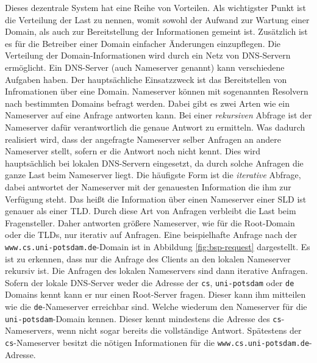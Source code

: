 \documentclass[a4paper, 12pt, BCOR10mm, DIV12, toc=bibliography, toc=listof, german]{scrbook}
\begin{document}
				Dieses dezentrale System hat eine Reihe von Vorteilen. Als wichtigster Punkt ist die
				Verteilung der Last zu nennen, womit sowohl der Aufwand zur Wartung einer Domain, als auch
				zur Bereitstellung der Informationen gemeint ist. Zusätzlich ist es für die Betreiber einer
				Domain einfacher Änderungen einzupflegen. Die Verteilung der Domain-Informationen wird durch
				ein Netz von DNS-Servern ermöglicht. Ein DNS-Server (auch Nameserver genannt) kann
				verschiedene Aufgaben haben. Der hauptsächliche Einsatzzweck ist das Bereitstellen von
				Infromationen über eine Domain. Nameserver können mit sogenannten Resolvern nach bestimmten
				Domains befragt werden. Dabei gibt es zwei Arten wie ein Nameserver auf eine Anfrage
				antworten kann. Bei einer \textit{rekursiven} Abfrage ist der Nameserver dafür
				verantwortlich die genaue Antwort zu ermitteln. Was dadurch realisiert wird, dass der
				angefragte Nameserver selber Anfragen an andere Nameserver stellt, sofern er die Antwort
				noch nicht kennt. Dies wird hauptsächlich bei lokalen DNS-Servern eingesetzt, da durch
				solche Anfragen die ganze Last beim Nameserver liegt. Die häufigste Form ist die
				\textit{iterative} Abfrage, dabei antwortet der Nameserver mit der genauesten Information
				die ihm zur Verfügung steht. Das heißt die Information über einen Nameserver einer SLD ist
				genauer als einer TLD. Durch diese Art von Anfragen verbleibt die Last beim Fragensteller.
				Daher antworten größere Nameserver, wie für die Root-Domain oder die TLDs, nur iterativ auf
				Anfragen. Eine beispielhafte Anfrage nach der \texttt{www.cs.uni-potsdam.de}-Domain ist in
				Abbildung \ref{fig:bsp-request} dargestellt. Es ist zu erkennen, dass nur die Anfrage des
				Clients an den lokalen Nameserver rekursiv ist. Die Anfragen des lokalen Nameservers sind
				dann iterative Anfragen. Sofern der lokale DNS-Server weder die Adresse der \texttt{cs},
				\texttt{uni-potsdam} oder \texttt{de} Domains kennt kann er nur einen Root-Server fragen.
				Dieser kann ihm mitteilen wie die \texttt{de}-Nameserver erreichbar sind. Welche wiederum
				den Nameserver für die \texttt{uni-potsdam}-Domain kennen.  Dieser kennt mindestens die
				Adresse des \texttt{cs}-Nameservers, wenn nicht sogar bereits die vollständige Antwort.
				Spätestens der \texttt{cs}-Nameserver besitzt die nötigen Informationen für die
				\texttt{www.cs.uni-potsdam.de}-Adresse.
\end{document}
